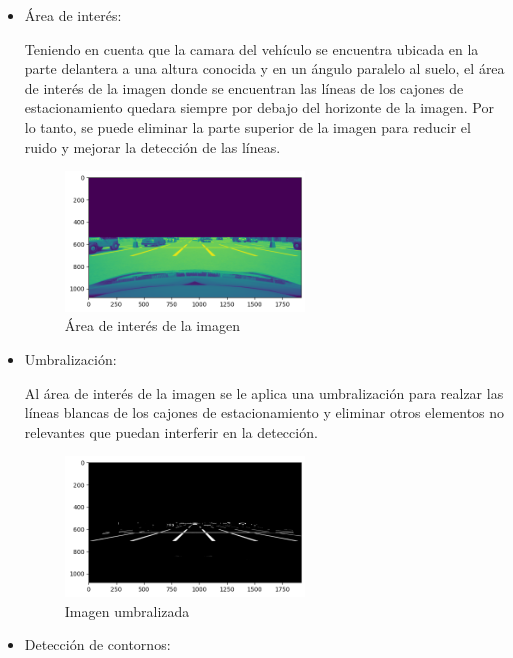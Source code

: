 \begin{itemize}
    \item Área de interés:

    Teniendo en cuenta que la camara del vehículo se encuentra ubicada en la parte delantera a una altura conocida y en un ángulo paralelo al suelo, el área de interés de la imagen donde se encuentran las líneas de los cajones de estacionamiento quedara siempre por debajo del horizonte de la imagen.
    Por lo tanto, se puede eliminar la parte superior de la imagen para
    reducir el ruido y mejorar la detección de las líneas.
    \begin{figure}[!ht]
        \centering
        \includegraphics[width=0.6\textwidth]{img/reticule/horizont}
        \caption{Área de interés de la imagen}
        \label{fig:roi}
    \end{figure}

    \item Umbralización:

    Al área de interés de la imagen se le aplica una umbralización para realzar las líneas blancas de los cajones de estacionamiento y eliminar otros elementos no relevantes que puedan interferir en la detección.
    \begin{figure}[!ht]
        \centering
        \includegraphics[width=0.6\textwidth]{img/reticule/thresholded}
        \caption{Imagen umbralizada}
        \label{fig:threshold}
    \end{figure}

    \clearpage
    \item Detección de contornos:


\end{itemize}
